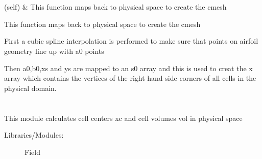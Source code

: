 \documentclass[letterpaper,10pt,english]{sphinxmanual}
\begin{document}
\begin{savenotes}\sphinxatlongtablestart\begin{longtable}[c]{}
\hline

\endfirsthead

%
{}\\
\hline

\endhead

\hline
{}\\
\endfoot

\endlastfoot

\sphinxAtStartPar
{\hyperref[\detokenize{autoapi/mesh_func/index:mesh_func.mesh}]{}}(self)
&
\sphinxAtStartPar
This function maps back to physical space to create the c\sphinxhyphen{}mesh
\\
\hline
\end{longtable}\sphinxatlongtableend\end{savenotes}

\begin{fulllineitems}
\label{\detokenize{autoapi/mesh_func/index:mesh_func.mesh}}
\sphinxAtStartPar
This function maps back to physical space to create the c\sphinxhyphen{}mesh

\sphinxAtStartPar
First a cubic spline interpolation is performed to make sure that points on airfoil geometry line up with a0 points

\sphinxAtStartPar
Then a0,b0,xs and ys are mapped to an s0 array and this is used to creat the x
array which contains the vertices of the right hand side corners of all cells
in the physical domain.

\end{fulllineitems}



\section{}
\label{\detokenize{autoapi/metric_func/index:module-metric_func}}\label{\detokenize{autoapi/metric_func/index:metric-func}}\label{\detokenize{autoapi/metric_func/index::doc}}
\sphinxAtStartPar
This module calculates cell centers xc and cell volumes vol in physical space
\begin{description}
\item[{Libraries/Modules:}] \leavevmode
\sphinxAtStartPar
Field

\end{description}
\end{document}
